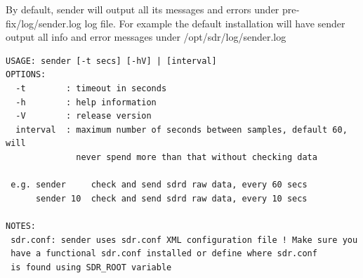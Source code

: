 By  default,  sender will output all its messages and errors under pre‐
fix/log/sender.log log file. For example the default installation will
have sender output all info and error messages under /opt/sdr/log/sender.log

\noindent
\newline
\begin{verbatim}
USAGE: sender [-t secs] [-hV] | [interval]
OPTIONS:
  -t        : timeout in seconds
  -h        : help information
  -V        : release version
  interval  : maximum number of seconds between samples, default 60, will 
              never spend more than that without checking data

 e.g. sender     check and send sdrd raw data, every 60 secs
      sender 10  check and send sdrd raw data, every 10 secs

NOTES:
 sdr.conf: sender uses sdr.conf XML configuration file ! Make sure you
 have a functional sdr.conf installed or define where sdr.conf
 is found using SDR_ROOT variable
\end{verbatim}



\endinput
